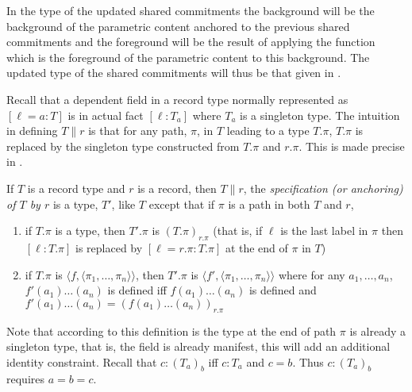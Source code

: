 In the type of the updated shared
commitments the background will be the background of the parametric
content anchored to the previous shared commitments and the foreground
will be the result of applying the function which is the foreground of
the parametric content to this background.
The updated type of the shared commitments
will thus be that given in \nexteg{}.   
\begin{ex} 
         \end{ex}



\begin{shaded}
  Recall that a dependent field in a record type normally represented
  as $[\ell=a:T]$ is in actual fact $[\ell:T_a]$ where $T_a$ is a
  singleton type.  The intuition in defining $T\parallel r$ is 
  that for any path, $\pi$, in $T$ leading to a type $T.\pi$, $T.\pi$ is
  replaced by the singleton type constructed from $T.\pi$ and $r.\pi$.
  This is made precise in \nexteg{}.
  \begin{ex} 
  If $T$ is a record type and $r$ is a record, then $T\parallel r$,  the
\textit{specification (or anchoring) of $T$ by
$r$} is a type, $T'$, like $T$ except that if $\pi$ is a path in both
$T$ and $r$,  
\begin{enumerate}
\item  if
$T.\pi$ is a type, then $T'.\pi$ is $(T.\pi)_{r.\pi}$ (that is, if
$\ell$ is the last label in $\pi$ then $[\ell:T.\pi]$ is replaced by
$[\ell=r.\pi:T.\pi]$ at the end of $\pi$ in $T$)

\item if $T.\pi$ is $\langle f,\langle\pi_1,\ldots,\pi_n\rangle\rangle$, then
  $T'.\pi$ is $\langle f',\langle\pi_1,\ldots,\pi_n\rangle\rangle$ where for any
  $a_1,\ldots,a_n$, $f'(a_1)\ldots(a_n)$ is defined iff
  $f(a_1)\ldots(a_n)$ is defined and $f'(a_1)\ldots(a_n) =
  (f(a_1)\ldots(a_n))_{r.\pi}$
\end{enumerate}
\end{ex}
Note that according to this definition is the type at the end of path
$\pi$ is already a singleton type, that is, the field is already
manifest, this will add an additional identity constraint.  Recall
that $c:(T_a)_b$ iff $c:T_a$ and $c=b$.  Thus $c:(T_a)_b$ requires $a=b=c$.


\end{shaded}
